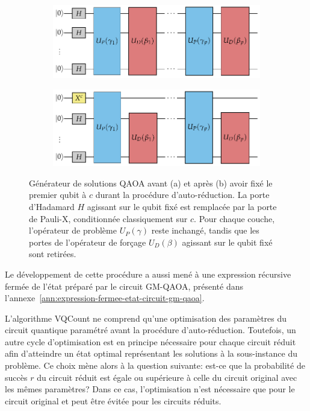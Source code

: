 \begin{figure}[h]
    \centering
    \begin{subfigure}[h]{0.7\textwidth}
        \centering
        \caption{}
        \includegraphics[width=1\textwidth]{figures/qaoa-self-reducibility-1.pdf}
        \label{fig:vqcount-circuit-a}
    \end{subfigure}
    \begin{subfigure}[h]{0.7\textwidth}
        \centering
        \caption{}
        \includegraphics[width=1\textwidth]{figures/qaoa-self-reducibility-2.pdf}
        \label{fig:vqcount-circuit-b}
    \end{subfigure}
    \caption[Procédure d'auto-réduction de VQCount]{Générateur de solutions QAOA avant (a) et après (b) avoir fixé le premier qubit à $c$ durant la procédure d'auto-réduction. La porte d'Hadamard $H$ agissant sur le qubit fixé est remplacée par la porte de Pauli-X, conditionnée classiquement sur $c$. Pour chaque couche, l'opérateur de problème $U_{P}(\gamma)$ reste inchangé, tandis que les portes de l'opérateur de forçage $U_{D}(\beta)$ agissant sur le qubit fixé sont retirées.}
    \label{fig:vqcount-circuit} 
\end{figure}

Le développement de cette procédure a aussi mené à une expression récursive fermée de l'état préparé par le circuit GM-QAOA, présenté dans l'annexe~\ref{ann:expression-fermee-etat-circuit-gm-qaoa}.

L'algorithme VQCount ne comprend qu'une optimisation des paramètres du circuit quantique paramétré avant la procédure d'auto-réduction. Toutefois, un autre cycle d'optimisation est en principe nécessaire pour chaque circuit réduit afin d'atteindre un état optimal représentant les solutions à la sous-instance du problème. Ce choix mène alors à la question suivante: est-ce que la probabilité de succès $r$ du circuit réduit est égale ou supérieure à celle du circuit original avec les mêmes paramètres? Dans ce cas, l'optimisation n'est nécessaire que pour le circuit original et peut être évitée pour les circuits réduits.

